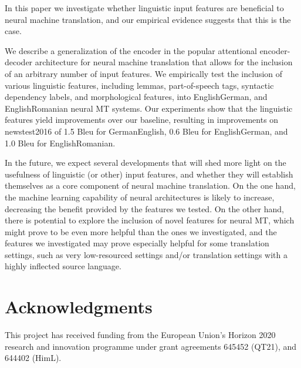 \documentclass[11pt]{article}
\begin{document}
In this paper we investigate whether
linguistic input features are beneficial to neural machine translation, and our empirical evidence suggests that this is the case.

We describe a generalization of the encoder in the popular attentional encoder-decoder architecture for neural machine translation that allows for the inclusion of an arbitrary number of input features. We empirically test the inclusion of various linguistic features, including lemmas, part-of-speech tags, syntactic dependency labels, and morphological features, into EnglishGerman, and EnglishRomanian neural MT systems.
Our experiments show that the linguistic features yield improvements over our baseline, resulting in improvements on newstest2016 of 1.5 {\sc Bleu} for GermanEnglish, 0.6 {\sc Bleu} for EnglishGerman, and 1.0 {\sc Bleu} for EnglishRomanian.

In the future, we expect several developments that will shed more light on the usefulness of linguistic (or other) input features, and whether they will establish themselves as a core component of neural machine translation.
On the one hand, the machine learning capability of neural architectures is likely to increase, decreasing the benefit provided by the features we tested.
On the other hand, there is potential to explore the inclusion of novel features for neural MT, which might prove to be even more helpful than the ones we investigated,
and the features we investigated may prove especially helpful for some translation settings, such as very low-resourced settings and/or translation settings with a highly inflected source language.

\section*{Acknowledgments}

This project has received funding from the European Union's Horizon 2020 research and innovation
programme under grant agreements 645452 (QT21), and 644402 (HimL).



\end{document}
